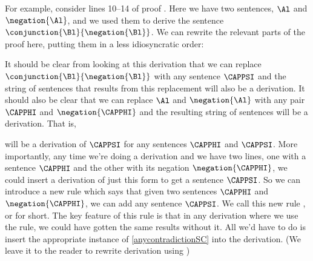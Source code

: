 For example, consider lines 10--14 of proof . Here we have two sentences, $\Al$ and $\negation{\Al}$, and we used them to derive the sentence $\conjunction{\Bl}{\negation{\Bl}}$. 
We can rewrite the relevant parts of the proof here, putting them in a less idiosyncratic order:
\begin{gproof}
\end{gproof}
It should be clear from looking at this derivation that we can replace $\conjunction{\Bl}{\negation{\Bl}}$ with any sentence $\CAPPSI$ and the string of sentences that results from this replacement will also be a derivation. 
It should also be clear that we can replace $\Al$ and $\negation{\Al}$ with any pair $\CAPPHI$ and $\negation{\CAPPHI}$ and the resulting string of sentences will be a derivation. 
That is,
\begin{gproof}[\label{anycontradictionSC}]
\end{gproof}
will be a derivation of $\CAPPSI$ for any sentences $\CAPPHI$ and $\CAPPSI$. 
More importantly, any time we're doing a derivation and we have two lines, one with a sentence $\CAPPHI$ and the other with its negation $\negation{\CAPPHI}$, we could insert a derivation of just this form to get a sentence $\CAPPSI$. 
So we can introduce a new rule which says that given two sentences $\CAPPHI$ and $\negation{\CAPPHI}$, we can add any sentence $\CAPPSI$. 
We call this new rule , or  for short. 
The key feature of this rule is that in any derivation where we use the rule, we could have gotten the same results without it. 
All we'd have to do is insert the appropriate instance of \ref{anycontradictionSC} into the derivation. (We leave it to the reader to rewrite derivation  using )
 
